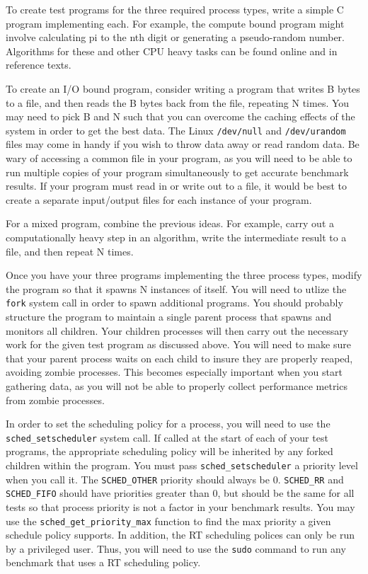 \documentclass[12pt]{article}
\begin{document}
To create test programs for the three required process types,
write a simple C program implementing
each. For example, the compute bound program might involve
calculating pi to the nth digit or generating a pseudo-random number.
Algorithms for these and other CPU
heavy tasks can be found online and in reference texts.

To create an
I/O bound program, consider writing a program that writes B bytes to a
file, and then reads the B bytes back from the file, repeating N
times. You may need to pick B and N such that you can overcome the
caching effects of the system in order to get the best data. The Linux
\texttt{/dev/null} and \texttt{/dev/urandom} files may come in handy
if you wish to throw data away or read random data. Be wary of
accessing a common file in your program, as you will need to be
able to run multiple copies of your program simultaneously to get
accurate benchmark results. If your program must read in or write out
to a file, it would be best to create a separate input/output files for
each instance of your program.

For a mixed program, combine the previous ideas. For example, carry out a
computationally heavy step in an algorithm, write the intermediate
result to a file, and then repeat N times.

Once you have your three programs implementing the three process types,
modify the program so that it spawns N instances of itself. You will
need to utlize the \texttt{fork} system call in order to spawn
additional programs. You should probably structure the program to
maintain a single parent process that spawns and monitors all
children. Your children processes will then carry out the necessary
work for the given test program as discussed above.
You will need to make sure that your parent process waits on
each child to insure they are properly reaped, avoiding zombie
processes. This becomes especially important when you start gathering data,
as you will not be able to properly collect performance metrics from
zombie processes. 

In order to set the scheduling policy for a process, you will need to
use the \texttt{sched\_setscheduler} system call. If called at the start
of each of your test programs, the appropriate scheduling policy
will be inherited by any forked children within the program. You must pass
\texttt{sched\_setscheduler} a priority level when you call it.
The \texttt{SCHED\_OTHER} priority should always be
0. \texttt{SCHED\_RR} and \texttt{SCHED\_FIFO} should have priorities
greater than 0, but should be the same for all tests so that process
priority is not a factor in your benchmark results. You may use the
\texttt{sched\_get\_priority\_max} function to find the max priority a
given schedule policy supports. In addition, the RT scheduling
polices can only be run by a privileged user. Thus, you will need to
use the \texttt{sudo} command to run any benchmark that uses a RT
scheduling policy.
\end{document}
